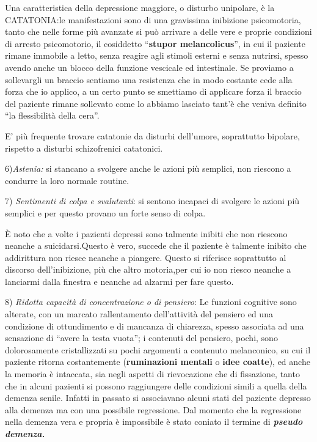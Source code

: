 \documentclass[]{article}
\begin{document}
Una caratteristica della depressione maggiore, o disturbo unipolare, è
la CATATONIA:le manifestazioni sono di una gravissima inibizione
psicomotoria, tanto che nelle forme più avanzate si può arrivare a delle
vere e proprie condizioni di arresto psicomotorio, il cosiddetto
``\textbf{stupor melancolicus}'', in cui il paziente rimane immobile a
letto, senza reagire agli stimoli esterni e senza nutrirsi, spesso
avendo anche un blocco della funzione vescicale ed intestinale. Se
proviamo a sollevargli un braccio sentiamo una resistenza che in modo
costante cede alla forza che io applico, a un certo punto se smettiamo
di applicare forza il braccio del paziente rimane sollevato come lo
abbiamo lasciato tant'è che veniva definito ``la flessibilità della
cera''.

E' più frequente trovare catatonie da disturbi dell'umore, soprattutto
bipolare, rispetto a disturbi schizofrenici catatonici.

6)\emph{Astenia:} si stancano a svolgere anche le azioni più semplici,
non riescono a condurre la loro normale routine.

7) \emph{Sentimenti di colpa e svalutanti}: si sentono incapaci di
svolgere le azioni più semplici e per questo provano un forte senso di
colpa.

È noto che a volte i pazienti depressi sono talmente inibiti che non
riescono neanche a suicidarsi.Questo è vero, succede che il paziente è
talmente inibito che addirittura non riesce neanche a piangere. Questo
si riferisce soprattutto al discorso dell'inibizione, più che altro
motoria,per cui io non riesco neanche a lanciarmi dalla finestra e
neanche ad alzarmi per fare questo.

8) \emph{Ridotta capacità di concentrazione o di pensiero}: Le funzioni
cognitive sono alterate, con un marcato rallentamento dell'attività del
pensiero ed una condizione di ottundimento e di mancanza di chiarezza,
spesso associata ad una sensazione di ``avere la testa vuota''; i
contenuti del pensiero, pochi, sono dolorosamente cristallizzati su
pochi argomenti a contenuto melanconico, su cui il paziente ritorna
costantemente (\textbf{ruminazioni mentali} o \textbf{idee coatte}), ed
anche la memoria è intaccata, sia negli aspetti di rievocazione che di
fissazione, tanto che in alcuni pazienti si possono raggiungere delle
condizioni simili a quella della demenza senile. Infatti in passato si
associavano alcuni stati del paziente depresso alla demenza ma con una
possibile regressione. Dal momento che la regressione nella demenza vera
e propria è impossibile è stato coniato il termine di
\textbf{\emph{pseudo demenza}.}
\end{document}
